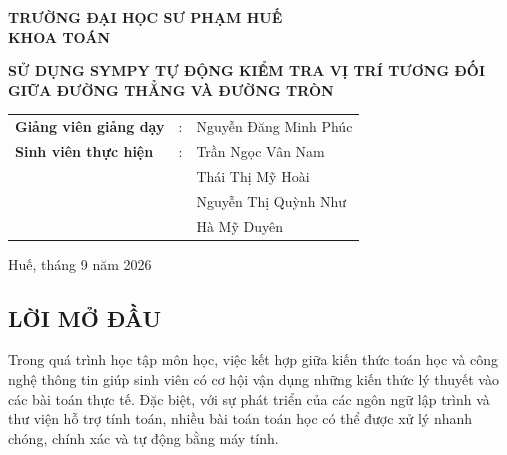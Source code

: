\documentclass[12pt,a4paper]{article}
\begin{document}
\begin{titlepage}

    \centering

    \vspace*{1.5cm}

    {\large \textbf{TRƯỜNG ĐẠI HỌC SƯ PHẠM HUẾ}}\\[0.3cm]
    {\large \textbf{KHOA TOÁN}}

    \vspace{5cm}


    {\LARGE \textbf{
    SỬ DỤNG SYMPY  TỰ ĐỘNG KIỂM TRA VỊ TRÍ TƯƠNG ĐỐI GIỮA ĐƯỜNG THẲNG VÀ ĐƯỜNG TRÒN}}

    \vspace{2cm}

    {\large
    \begin{tabular}{lcl}
        \textbf{Giảng viên giảng dạy} & : & Nguyễn Đăng Minh Phúc\\[0.3cm]
      \textbf{Sinh viên thực hiện} & : & Trần Ngọc Vân Nam \\
                         &   & Thái Thị Mỹ Hoài \\
                         &   & Nguyễn Thị Quỳnh Như \\
                         &   & Hà Mỹ Duyên \\

    \end{tabular}
}
    \vfill
    {\large Huế, tháng 9 năm 2026}
    \vspace*{0.2cm}

\end{titlepage}


\begin{center}
    \section*{LỜI MỞ ĐẦU}
\end{center}

Trong quá trình học tập môn học, việc kết hợp giữa kiến thức toán học và công nghệ thông tin giúp sinh viên có cơ hội vận dụng những kiến thức lý thuyết vào các bài toán thực tế. Đặc biệt, với sự phát triển của các ngôn ngữ lập trình và thư viện hỗ trợ tính toán, nhiều bài toán toán học có thể được xử lý nhanh chóng, chính xác và tự động bằng máy tính.
\end{document}
